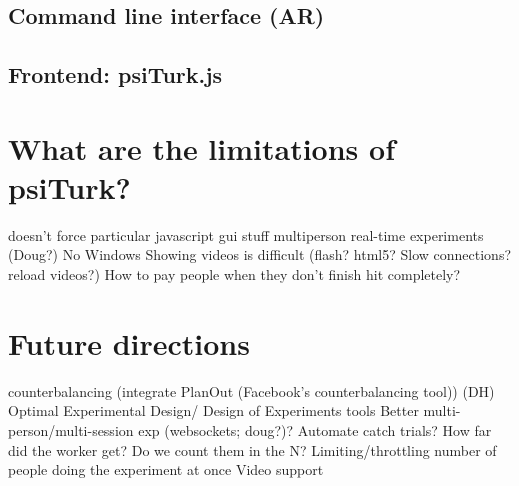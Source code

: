 \documentclass[jou,apacite]{apa6}
\begin{document}
\subsection{Command line interface (AR)}


\subsection{Frontend: psiTurk.js}


\section{What are the limitations of psiTurk?}
doesn't force particular javascript gui stuff
multiperson real-time experiments (Doug?) 
No Windows
Showing videos is difficult (flash? html5? Slow connections? reload videos?)
How to pay people when they don't finish hit completely?

\section{Future directions}
counterbalancing (integrate PlanOut (Facebook's counterbalancing tool)) (DH)
Optimal Experimental Design/ Design of Experiments tools
Better multi-person/multi-session exp (websockets; doug?)?
Automate catch trials? How far did the worker get? Do we count them in the N? 
Limiting/throttling number of people doing the experiment at once
Video support


\end{document}
